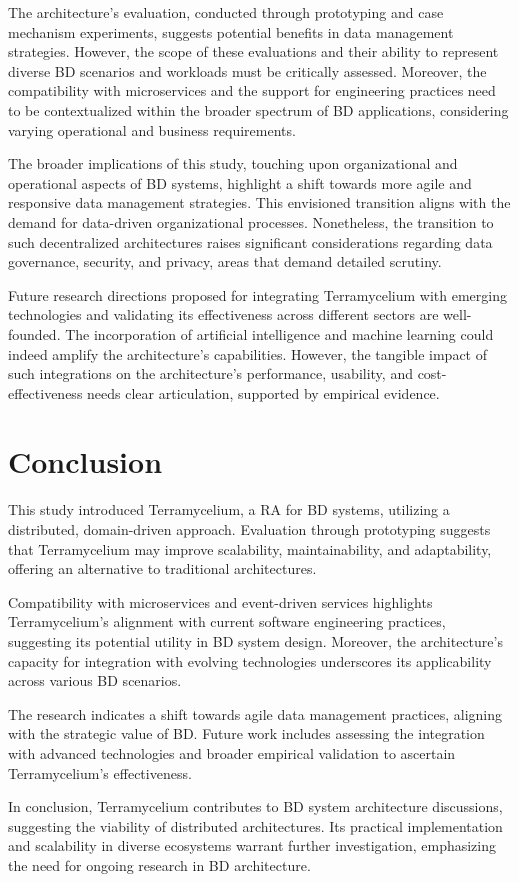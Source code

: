 \documentclass[journal]{IEEEtran}
\begin{document}
The architecture's evaluation, conducted through prototyping and case mechanism experiments, suggests potential benefits in data management strategies. However, the scope of these evaluations and their ability to represent diverse BD scenarios and workloads must be critically assessed. Moreover, the compatibility with microservices and the support for engineering practices need to be contextualized within the broader spectrum of BD applications, considering varying operational and business requirements.

The broader implications of this study, touching upon organizational and operational aspects of BD systems, highlight a shift towards more agile and responsive data management strategies. This envisioned transition aligns with the demand for data-driven organizational processes. Nonetheless, the transition to such decentralized architectures raises significant considerations regarding data governance, security, and privacy, areas that demand detailed scrutiny.

Future research directions proposed for integrating Terramycelium with emerging technologies and validating its effectiveness across different sectors are well-founded. The incorporation of artificial intelligence and machine learning could indeed amplify the architecture's capabilities. However, the tangible impact of such integrations on the architecture's performance, usability, and cost-effectiveness needs clear articulation, supported by empirical evidence.



\section{Conclusion}

This study introduced Terramycelium, a RA for BD systems, utilizing a distributed, domain-driven approach. Evaluation through prototyping suggests that Terramycelium may improve scalability, maintainability, and adaptability, offering an alternative to traditional architectures.

Compatibility with microservices and event-driven services highlights Terramycelium's alignment with current software engineering practices, suggesting its potential utility in BD system design. Moreover, the architecture's capacity for integration with evolving technologies underscores its applicability across various BD scenarios.

The research indicates a shift towards agile data management practices, aligning with the strategic value of BD. Future work includes assessing the integration with advanced technologies and broader empirical validation to ascertain Terramycelium's effectiveness.

In conclusion, Terramycelium contributes to BD system architecture discussions, suggesting the viability of distributed architectures. Its practical implementation and scalability in diverse ecosystems warrant further investigation, emphasizing the need for ongoing research in BD architecture.


\appendix







\end{document}
